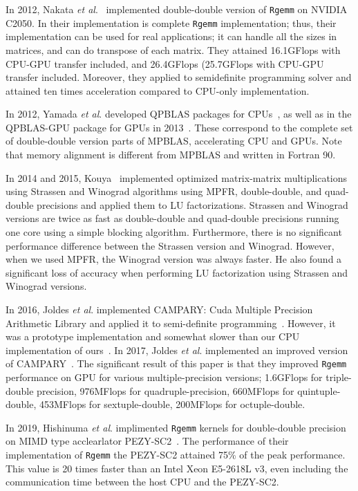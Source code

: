 \documentclass[12pt]{article}
\newcommand{\etal}{\textit{et al}.}
\begin{document}
In 2012, Nakata \etal{}~\cite{6495966} implemented double-double version of {\tt Rgemm} on NVIDIA C2050. In their implementation is complete {\tt Rgemm} implementation; thus, their implementation can be used for real applications; it can handle all the sizes in matrices, and can do transpose of each matrix. They attained 16.1GFlops with CPU-GPU transfer included, and 26.4GFlops (25.7GFlops with CPU-GPU transfer included. Moreover, they applied to semidefinite programming solver and attained ten times acceleration compared to CPU-only implementation.

In 2012, Yamada \etal{} developed QPBLAS packages for CPUs~\cite{7965202}, as well as in the QPBLAS-GPU package for GPUs in 2013~\cite{qpblas-gpu}. These correspond to the complete set of double-double version parts of MPBLAS, accelerating CPU and GPUs. Note that memory alignment is different from MPBLAS and written in Fortran 90.

In 2014 and 2015, Kouya~\cite{Tomonori_Kouya2014,Tomonori_Kouya2016} implemented optimized  matrix-matrix multiplications using Strassen and Winograd algorithms using MPFR, double-double, and quad-double precisions and applied them to LU factorizations. Strassen and Winograd versions are twice as fast as double-double and quad-double precisions running one core using a simple blocking algorithm. Furthermore, there is no significant performance difference between the Strassen version and Winograd. However, when we used MPFR, the Winograd version was always faster. He also found a significant loss of accuracy when performing LU factorization using Strassen and Winograd versions. 

In 2016, Joldes \etal{} implemented CAMPARY: Cuda Multiple Precision Arithmetic Library and applied it to semi-definite programming~\cite{10.1007/978-3-319-42432-3_29}. However, it was a prototype implementation and somewhat slower than our CPU implementation of ours~\cite{SDPA-GMP}. In 2017, Joldes \etal{} implemented an improved version of CAMPARY~\cite{8023060}. The significant result of this paper is that they improved {\tt Rgemm} performance on GPU for various multiple-precision versions; 1.6GFlops for triple-double precision, 976MFlops for quadruple-precision, 660MFlops for quintuple-double, 453MFlops for sextuple-double, 200MFlops for octuple-double.

In 2019, Hishinuma \etal{} implimented {\tt Rgemm} kernels for double-double precision on MIMD type acclearlator PEZY-SC2~\cite{hishinuma2019pzqd}. 
The performance of their implementation of {\tt Rgemm} the PEZY-SC2 attained 75\% of the peak performance. This value is 20 times faster than an Intel Xeon E5-2618L v3, even including the communication time between the host CPU and the PEZY-SC2.
\end{document}
